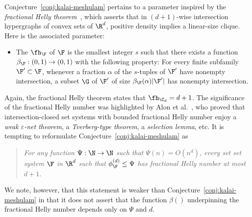 %
\medskip
%
Conjecture~\ref{conj:kalai-meshulam} pertains to a parameter inspired by the \emph{fractional Helly theorem}~\cite{katchalski1979problem,kalai1984intersection}, which asserts that in $(d+1)$-wise intersection hypergraphs of convex sets of $\R^d$, positive density implies a linear-size clique. Here is the associated parameter:
%
\begin{itemize}
\item The  $\fh_\F$ of $\F$ is the smallest integer $s$ such that there exists a function $\beta_\F:(0,1)\rightarrow (0,1)$ with the following property: For every finite subfamily $\F'\subset \F$, whenever a fraction $\alpha$ of the $s$-tuples of $\F'$ have nonempty intersection, a subset $\G$ of $\F'$ of size $\beta_\F(\alpha)|\F'|$ has nonempty intersection.
\end{itemize}
%
\noindent
Again, the fractional Helly theorem states that $\fh_{\C_ d} = d+1$. The significance of the fractional Helly number was highlighted by Alon et al.~\cite{transversal-hypergraph}, who proved that intersection-closed set systems with bounded fractional Helly number enjoy a \emph{weak $\varepsilon$-net theorem}, a \emph{Tverberg-type theorem}, a \emph{selection lemma}, etc. It is tempting to reformulate Conjecture~\ref{conj:kalai-meshulam} as
%
\begin{quote}
  \emph{For any function $\Psi: \N \to \N$ such that $\Psi(n) = O(n^d)$, every set set system $\F$ in $\R^d$ such that $\phi_{\F}^{(d)} \le \Psi$ has fractional Helly number at most $d+1$.}
\end{quote}
%
\noindent We note, however, that this statement is weaker than Conjecture~\ref{conj:kalai-meshulam} in that it does not assert that the function $\beta()$ underpinning the fractional Helly number depends only on $\Psi$ and $d$.
%
%
